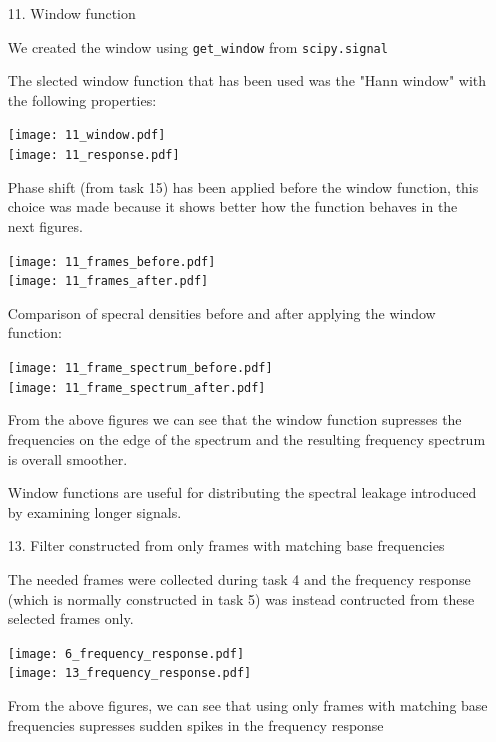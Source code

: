 \documentclass[a4paper, 11pt]{article}
\begin{document}
    \begin{enumerate}
        \item[11.]
        Window function

        We created the window using \texttt{get\_window} from \texttt{scipy.signal}

        The slected window function that has been used was the "Hann window" with the following properties:

        \texttt{[image: 11\_window.pdf]} \\
        \texttt{[image: 11\_response.pdf]}

        Phase shift (from task 15) has been applied before the window function,
        this choice was made because it shows better how the function behaves in the next figures.

        \texttt{[image: 11\_frames\_before.pdf]} \\
        \texttt{[image: 11\_frames\_after.pdf]}

        \newpage
        Comparison of specral densities before and after applying the window function:

        \texttt{[image: 11\_frame\_spectrum\_before.pdf]} \\
        \texttt{[image: 11\_frame\_spectrum\_after.pdf]}

        From the above figures we can see that the window function
        supresses the frequencies on the edge of the spectrum and the resulting frequency spectrum is overall smoother.

        Window functions are useful for distributing the spectral leakage introduced by examining longer signals.

        \vspace{6mm}
        \item[13.]
        Filter constructed from only frames with matching base frequencies

        The needed frames were collected during task 4 and the frequency response
        (which is normally constructed in task 5) was instead contructed from these selected frames only.

        \texttt{[image: 6\_frequency\_response.pdf]} \\
        \texttt{[image: 13\_frequency\_response.pdf]}

        From the above figures, we can see that using only frames with matching base frequencies supresses
        sudden spikes in the frequency response


\end{enumerate}
\end{document}
